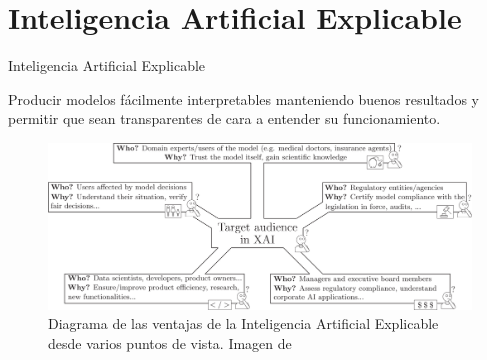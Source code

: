 \documentclass{beamer}
\begin{document}
\section{Inteligencia Artificial Explicable}
\begin{frame}{Inteligencia Artificial Explicable}

	Producir modelos fácilmente interpretables manteniendo buenos resultados y permitir que sean transparentes de cara a entender su funcionamiento.

	\begin{figure}[H]
		\centering
		\includegraphics[scale = 0.65]{esquema_xai.png}
		\caption{Diagrama de las ventajas de la Inteligencia Artificial Explicable desde varios puntos de vista. Imagen de \cite{XAI}}
		\label{fig:esquema_xai}
	\end{figure}

\end{frame}
\end{document}
